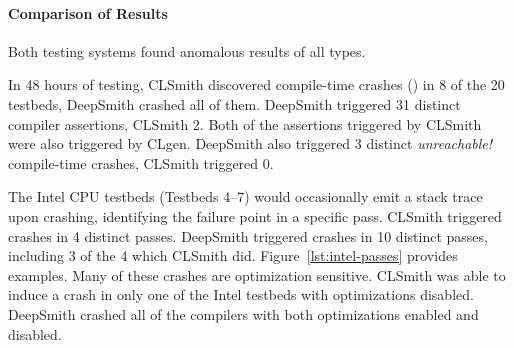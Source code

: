 



\paragraph{Comparison of Results} %
Both testing systems found anomalous results of all types.

In 48 hours of testing, CLSmith discovered compile-time crashes (\bc) in 8 of the 20 testbeds, DeepSmith crashed all of them. DeepSmith triggered 31 distinct compiler assertions, CLSmith 2. Both of the assertions triggered by CLSmith were also triggered by CLgen. DeepSmith also triggered 3 distinct \emph{unreachable!} compile-time crashes, CLSmith triggered 0.

The Intel CPU testbeds (Testbeds 4--7) would occasionally emit a stack trace upon crashing, identifying the failure point in a specific pass. CLSmith triggered crashes in 4 distinct passes. DeepSmith triggered crashes in 10 distinct passes, including 3 of the 4 which CLSmith did. Figure~\ref{lst:intel-passes} provides examples. Many of these crashes are optimization sensitive. CLSmith was able to induce a crash in only one of the Intel testbeds with optimizations disabled. DeepSmith crashed all of the compilers with both optimizations enabled and disabled.


%

